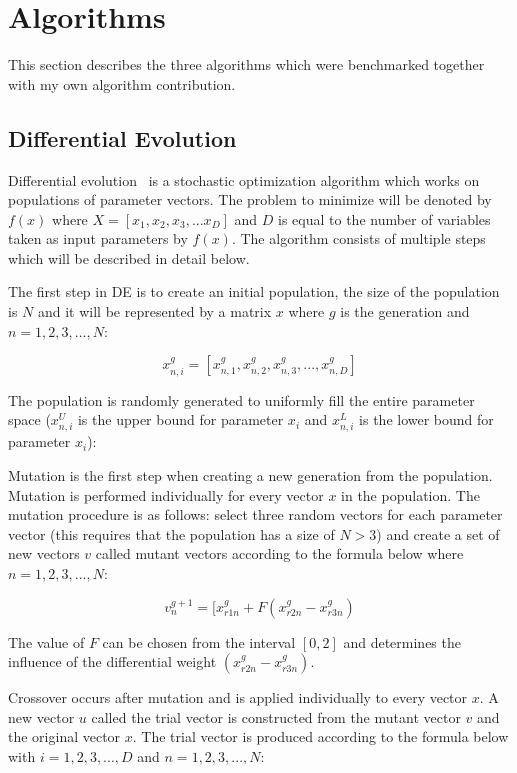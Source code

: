 \section{Algorithms}

This section describes the three algorithms which were benchmarked together with my own algorithm contribution.

\subsection{Differential Evolution}

Differential evolution~\cite{Storn1997} is a stochastic optimization algorithm which works on populations of parameter vectors. The problem to minimize will be denoted by $f(x)$ where $X=[x_1,x_2,x_3,...x_D]$ and $D$ is equal to the number of variables taken as input parameters by $f(x)$. The algorithm consists of multiple steps which will be described in detail below.

The first step in DE is to create an initial population, the size of the population is $N$ and it will be represented by a matrix $x$ where $g$ is the generation and $n=1,2,3,...,N$:

\begin{equation}
x_{n,i}^{g} = [ x_{n,1}^{g}, x_{n,2}^{g}, x_{n,3}^{g}, ..., x_{n,D}^{g} ]
\end{equation}

The population is randomly generated to uniformly fill the entire parameter space ($x_{n,i}^U$ is the upper bound for parameter $x_i$ and $x_{n,i}^L$ is the lower bound for parameter $x_i$):

Mutation is the first step when creating a new generation from the population. Mutation is performed individually for every vector $x$ in the population. The mutation procedure is as follows: select three random vectors for each parameter vector (this requires that the population has a size of $N > 3$) and create a set of new vectors $v$ called mutant vectors according to the formula below where $n=1,2,3,...,N$:

\begin{equation}
v_{n}^{g+1} = [ x_{r1n}^{g} + F(x_{r2n}^{g} - x_{r3n}^{g})
\end{equation}

The value of $F$ can be chosen from the interval $[0,2]$ and determines the influence of the differential weight $(x_{r2n}^{g} - x_{r3n}^{g})$.

Crossover occurs after mutation and is applied individually to every vector $x$. A new vector $u$ called the trial vector is constructed from the mutant vector $v$ and the original vector $x$. The trial vector is produced according to the formula below with $i=1,2,3,...,D$ and $n=1,2,3,...,N$:

